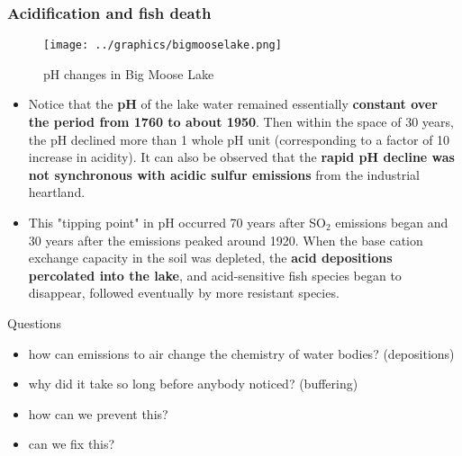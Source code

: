 \documentclass[a4paper,titlepage]{article}
\begin{document}
\begin{frame}
\frametitle{Acidification and fish death}
 {\begin{figure} \texttt{[image: ../graphics/bigmooselake.png]} \caption{pH changes in Big Moose Lake} \end{figure}}
 {\begin{itemize}
\item Notice that the \textbf{pH} of the lake water remained essentially \textbf{constant over the period from 1760 to about 1950}. Then within the space of 30 years, the pH declined more than 1 whole pH unit (corresponding to a factor of 10 increase in acidity). It can also be observed that the \textbf{rapid pH decline was not synchronous with acidic sulfur emissions} from the industrial heartland. \par\medskip

\item This "tipping point" in pH occurred 70 years after SO\(_2\) emissions began and 30 years after the emissions peaked around 1920. When the base cation exchange capacity in the soil was depleted, the \textbf{acid depositions percolated into the lake}, and acid-sensitive fish species began to disappear, followed eventually by more resistant species. \end{itemize}}
\end{frame}

\begin{frame}{Questions}
\begin{itemize}
\item how can emissions to air change the chemistry of water bodies? (depositions)
\item why did it take so long before anybody noticed? (buffering)
\item how can we prevent this?
\item can we fix this?
\end{itemize}
\end{frame}
\end{document}
